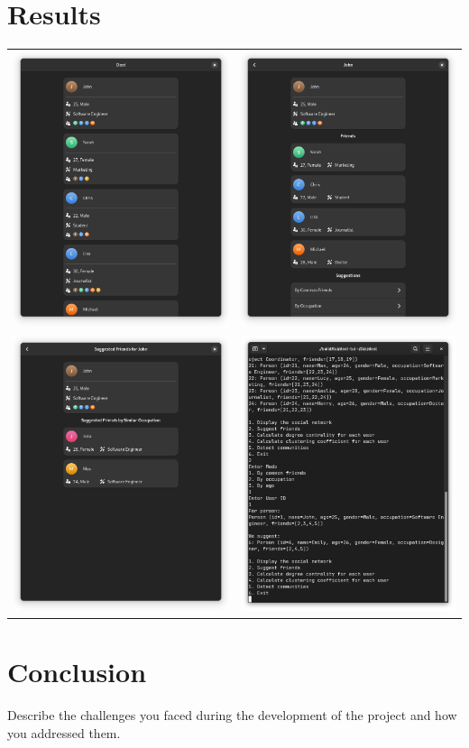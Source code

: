 \documentclass[twocolumn]{article}
\begin{document}
\section{Results}
\begin{tabular}{cc}
    \includegraphics[width=.225\textwidth]{gui0} &
    \includegraphics[width=.225\textwidth]{gui1}
     \\
     \includegraphics[width=.225\textwidth]{gui2} &
     \includegraphics[width=.225\textwidth]{tui}
\end{tabular}
  
\section{Conclusion}
Describe the challenges you faced during the development of the project and how you addressed them.
\end{document}
